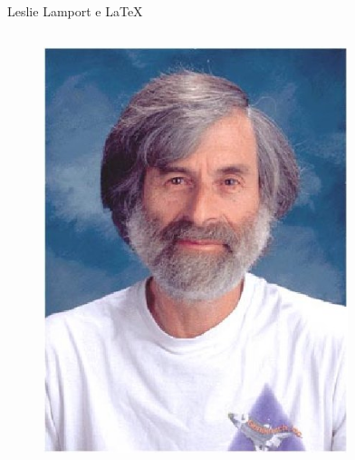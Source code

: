 \documentclass[hyperref={pdfpagelabels=false}]{beamer}
\begin{document}
\begin{frame}{Leslie Lamport e \LaTeX{}}
    \begin{columns}[c]
        \begin{column}{0.5\textwidth}
            \begin{figure}
                \centering{}
                \includegraphics[width=\textwidth]{images/lamport}
            \end{figure}
        \end{column}
        \begin{column}{0.5\textwidth}
            \begin{figure}
                \centering{}

\end{figure}
\end{column}
\end{columns}
\end{frame}
\end{document}
